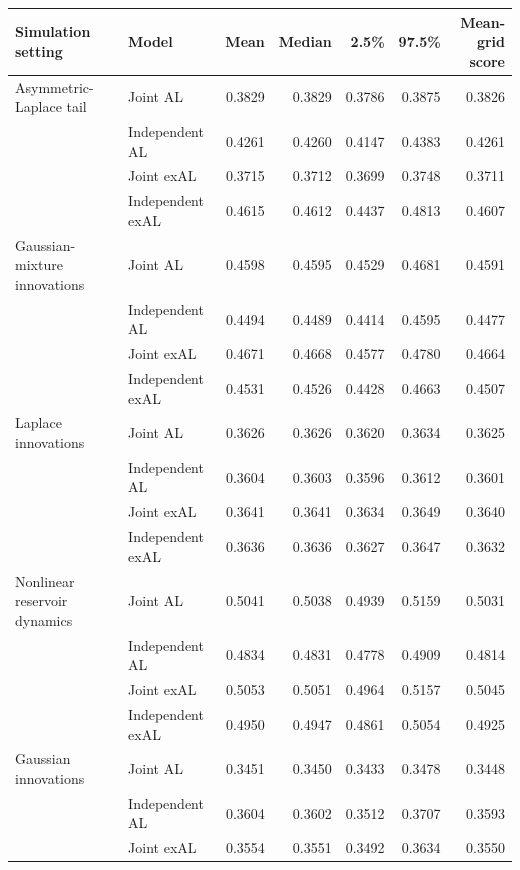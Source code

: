 \begin{table}[p]
\centering
\footnotesize
\setlength{\tabcolsep}{3pt}
\renewcommand{\arraystretch}{1.08}
\begin{tabular}{@{}>{\raggedright\arraybackslash}p{}>{\raggedright\arraybackslash}p{}rrrrr@{}}
\toprule
Simulation setting & Model & Mean & Median & 2.5\% & 97.5\% & \shortstack{Mean-grid\\score} \\
\midrule
Asymmetric-Laplace tail & Joint AL & 0.3829 & 0.3829 & 0.3786 & 0.3875 & 0.3826 \\
 & Independent AL & 0.4261 & 0.4260 & 0.4147 & 0.4383 & 0.4261 \\
 & Joint exAL & 0.3715 & 0.3712 & 0.3699 & 0.3748 & 0.3711 \\
 & Independent exAL & 0.4615 & 0.4612 & 0.4437 & 0.4813 & 0.4607 \\
\addlinespace[2pt]
Gaussian-mixture innovations & Joint AL & 0.4598 & 0.4595 & 0.4529 & 0.4681 & 0.4591 \\
 & Independent AL & 0.4494 & 0.4489 & 0.4414 & 0.4595 & 0.4477 \\
 & Joint exAL & 0.4671 & 0.4668 & 0.4577 & 0.4780 & 0.4664 \\
 & Independent exAL & 0.4531 & 0.4526 & 0.4428 & 0.4663 & 0.4507 \\
\addlinespace[2pt]
Laplace innovations & Joint AL & 0.3626 & 0.3626 & 0.3620 & 0.3634 & 0.3625 \\
 & Independent AL & 0.3604 & 0.3603 & 0.3596 & 0.3612 & 0.3601 \\
 & Joint exAL & 0.3641 & 0.3641 & 0.3634 & 0.3649 & 0.3640 \\
 & Independent exAL & 0.3636 & 0.3636 & 0.3627 & 0.3647 & 0.3632 \\
\addlinespace[2pt]
Nonlinear reservoir dynamics & Joint AL & 0.5041 & 0.5038 & 0.4939 & 0.5159 & 0.5031 \\
 & Independent AL & 0.4834 & 0.4831 & 0.4778 & 0.4909 & 0.4814 \\
 & Joint exAL & 0.5053 & 0.5051 & 0.4964 & 0.5157 & 0.5045 \\
 & Independent exAL & 0.4950 & 0.4947 & 0.4861 & 0.5054 & 0.4925 \\
\addlinespace[2pt]
Gaussian innovations & Joint AL & 0.3451 & 0.3450 & 0.3433 & 0.3478 & 0.3448 \\
 & Independent AL & 0.3604 & 0.3602 & 0.3512 & 0.3707 & 0.3593 \\
 & Joint exAL & 0.3554 & 0.3551 & 0.3492 & 0.3634 & 0.3550 \\

\end{tabular}
\end{table}
